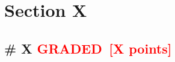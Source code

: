 \documentclass[12pt,letterpaper]{exam}
\newcommand{\grade}{\textcolor{red}{GRADED}}
\newcommand{\pts}[1]{\textcolor{red}{[#1]}}
\begin{document}
\section*{Section X}

\subsection*{\# X \grade \, \pts{X points}}
\end{document}

